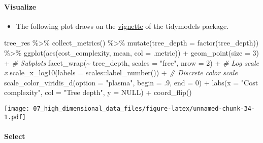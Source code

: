 \documentclass[
]{book}
\newenvironment{Shaded}{\begin{snugshade}}{\end{snugshade}}
\newcommand{\AttributeTok}[1]{\textcolor[rgb]{0.77,0.63,0.00}{#1}}
\newcommand{\CommentTok}[1]{\textcolor[rgb]{0.56,0.35,0.01}{\textit{#1}}}
\newcommand{\ConstantTok}[1]{\textcolor[rgb]{0.00,0.00,0.00}{#1}}
\newcommand{\DecValTok}[1]{\textcolor[rgb]{0.00,0.00,0.81}{#1}}
\newcommand{\FunctionTok}[1]{\textcolor[rgb]{0.00,0.00,0.00}{#1}}
\newcommand{\NormalTok}[1]{#1}
\newcommand{\SpecialCharTok}[1]{\textcolor[rgb]{0.00,0.00,0.00}{#1}}
\newcommand{\StringTok}[1]{\textcolor[rgb]{0.31,0.60,0.02}{#1}}
\providecommand{\tightlist}{%
  \setlength{\itemsep}{0pt}\setlength{\parskip}{0pt}}
\begin{document}
\hypertarget{visualize-1}{%
\paragraph{Visualize}\label{visualize-1}}

\begin{itemize}
\tightlist
\item
  The following plot draws on the \href{https://www.tidymodels.org/start/tuning/}{vignette} of the tidymodels package.
\end{itemize}

\begin{Shaded}
\begin{Highlighting}[]
\NormalTok{tree\_res }\SpecialCharTok{\%\textgreater{}\%}
  \FunctionTok{collect\_metrics}\NormalTok{() }\SpecialCharTok{\%\textgreater{}\%}
  \FunctionTok{mutate}\NormalTok{(}\AttributeTok{tree\_depth =} \FunctionTok{factor}\NormalTok{(tree\_depth)) }\SpecialCharTok{\%\textgreater{}\%}
  \FunctionTok{ggplot}\NormalTok{(}\FunctionTok{aes}\NormalTok{(cost\_complexity, mean, }\AttributeTok{col =}\NormalTok{ .metric)) }\SpecialCharTok{+}
  \FunctionTok{geom\_point}\NormalTok{(}\AttributeTok{size =} \DecValTok{3}\NormalTok{) }\SpecialCharTok{+}
  \CommentTok{\# Subplots }
  \FunctionTok{facet\_wrap}\NormalTok{(}\SpecialCharTok{\textasciitilde{}}\NormalTok{ tree\_depth, }
             \AttributeTok{scales =} \StringTok{"free"}\NormalTok{, }
             \AttributeTok{nrow =} \DecValTok{2}\NormalTok{) }\SpecialCharTok{+}
  \CommentTok{\# Log scale x }
  \FunctionTok{scale\_x\_log10}\NormalTok{(}\AttributeTok{labels =}\NormalTok{ scales}\SpecialCharTok{::}\FunctionTok{label\_number}\NormalTok{()) }\SpecialCharTok{+}
  \CommentTok{\# Discrete color scale }
  \FunctionTok{scale\_color\_viridis\_d}\NormalTok{(}\AttributeTok{option =} \StringTok{"plasma"}\NormalTok{, }\AttributeTok{begin =}\NormalTok{ .}\DecValTok{9}\NormalTok{, }\AttributeTok{end =} \DecValTok{0}\NormalTok{) }\SpecialCharTok{+}
  \FunctionTok{labs}\NormalTok{(}\AttributeTok{x =} \StringTok{"Cost complexity"}\NormalTok{,}
       \AttributeTok{col =} \StringTok{"Tree depth"}\NormalTok{,}
       \AttributeTok{y =} \ConstantTok{NULL}\NormalTok{) }\SpecialCharTok{+}
  \FunctionTok{coord\_flip}\NormalTok{()}
\end{Highlighting}
\end{Shaded}

\texttt{[image: 07\_high\_dimensional\_data\_files/figure-latex/unnamed-chunk-34-1.pdf]}

\hypertarget{select-1}{%
\paragraph{Select}\label{select-1}}
\end{document}
